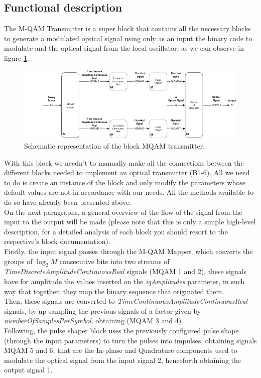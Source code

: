 \subsection*{Functional description}

The M-QAM Transmitter is a super block that contains all the necessary blocks to generate a modulated optical signal using only as an input the binary code to modulate and the optical signal from the local oscillator, as we can observe in figure \ref{MQAM_transmitter_block_diagram}.

\begin{figure}[H]
	\centering \includegraphics[width=\textwidth]{./lib/m_qam_transmitter/figures/simulation_tx.pdf}
	\caption{Schematic representation of the block MQAM transmitter.}\label{MQAM_transmitter_block_diagram}
\end{figure}
With this block we needn't to manually make all the connections between the different blocks needed to implement an optical transmitter (B1-6). All we need to do is create an instance of the block and only modify the parameters whose default values are not in accordance with our needs. All the methods available to do so have already been presented above.\\
On the next paragraphs, a general overview of the flow of the signal from the input to the output will be made (please note that this is only a simple high-level description, for a detailed analysis of each block you should resort to the respective's block documentation).\\
Firstly, the input signal passes through the M-QAM Mapper, which converts the groups of $\log_2M$ consecutive bits into two streams of \textit{TimeDiscreteAmplitudeContinuousReal} signals (MQAM 1 and 2), these signals have for amplitude the values inserted on the \textit{iqAmplitudes} parameter, in such way that together, they map the binary sequence that originated them.\\
Then, these signals are converted to \textit{TimeContinuousAmplitudeContinuousReal} signals, by up-sampling the previous signals of a factor given by \textit{numberOfSamplesPerSymbol}, obtaining (MQAM 3 and 4).\\
Following, the pulse shaper block uses the previously configured pulse shape (through the input parameters) to turn the pulses into impulses, obtaining signals MQAM 5 and 6, that are the In-phase and Quadrature components used to modulate the optical signal from the input signal 2, henceforth obtaining the output signal 1.\\





